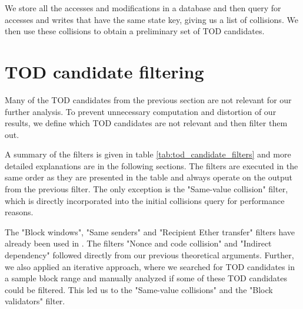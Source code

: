 \documentclass[draft,final]{vutinfth} %
\begin{document}
We store all the accesses and modifications in a database and then query for accesses and writes that have the same state key, giving us a list of collisions. We then use these collisions to obtain a preliminary set of TOD candidates.

\section{TOD candidate filtering}

Many of the TOD candidates from the previous section are not relevant for our further analysis. To prevent unnecessary computation and distortion of our results, we define which TOD candidates are not relevant and then filter them out.

A summary of the filters is given in table \ref{tab:tod_candidate_filters} and more detailed explanations are in the following sections. The filters are executed in the same order as they are presented in the table and always operate on the output from the previous filter. The only exception is the "Same-value collision" filter, which is directly incorporated into the initial collisions query for performance reasons.

The "Block windows", "Same senders" and "Recipient Ether transfer" filters have already been used in \cite{zhang_erebus-redgiant_2023}. The filters "Nonce and code collision" and "Indirect dependency" followed directly from our previous theoretical arguments. Further, we also applied an iterative approach, where we searched for TOD candidates in a sample block range and manually analyzed if some of these TOD candidates could be filtered. This led us to the "Same-value collisions" and the "Block validators" filter.
\end{document}
